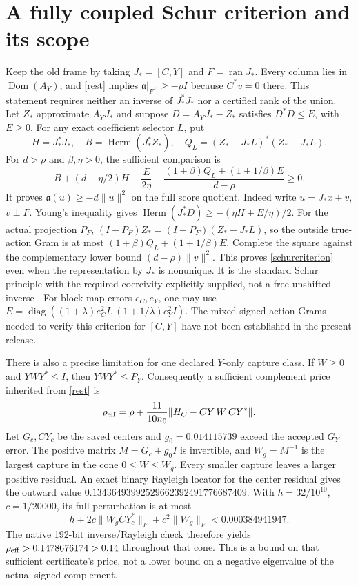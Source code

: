 \documentclass[11pt]{article}
\newcommand{\Ran}{\operatorname{ran}}
\newcommand{\Dom}{\operatorname{Dom}}
\numberwithin{equation}{section}
\begin{document}
\section{A fully coupled Schur criterion and its scope}\label{schur}
Keep the old frame by taking $J_*= [C,Y]$ and $F=\Ran J_*$.
Every column lies in $\Dom(A_Y)$, and \eqref{rest} implies
$\mathfrak a|_{F^\perp}\ge-\rho I$ because $C^*v=0$ there.
This statement requires neither an inverse of $J_*^*J_*$ nor a
certified rank of the union.
Let $Z_*$ approximate $A_YJ_*$ and suppose
$D=A_YJ_*-Z_*$ satisfies $D^*D\le E$, with $E\ge0$.
For any exact coefficient selector $L$, put
\[
 H=J_*^*J_*,\quad B=\operatorname{Herm}(J_*^*Z_*),\quad
 Q_L=(Z_*-J_*L)^*(Z_*-J_*L).
\]
For $d>\rho$ and $\beta,\eta>0$, the sufficient comparison is
\begin{equation}\label{schurcriterion}
 B+(d-\eta/2)H-\frac E{2\eta}
 -\frac{(1+\beta)Q_L+(1+1/\beta)E}{d-\rho}\ge0.
\end{equation}
It proves $\mathfrak a(u)\ge-d\|u\|^2$ on the full score quotient.
Indeed write $u=J_*x+v$, $v\perp F$. Young's inequality gives
$\operatorname{Herm}(J_*^*D)\ge-(\eta H+E/\eta)/2$.
For the actual projection $P_F$,
$(I-P_F)Z_*=(I-P_F)(Z_*-J_*L)$, so the outside true-action Gram is
at most $(1+\beta)Q_L+(1+1/\beta)E$. Complete the square against
the complementary lower bound $(d-\rho)\|v\|^2$.
This proves \eqref{schurcriterion} even when the representation by
$J_*$ is nonunique. It is the standard Schur principle with the
required coercivity explicitly supplied, not a free unshifted inverse
\cite[Theorem 1.2]{DSS}.
For block map errors $e_C,e_Y$, one may use
$E=\operatorname{diag}((1+\lambda)e_C^2I,(1+1/\lambda)e_Y^2I)$.
The mixed signed-action Grams needed to verify this criterion for
$[C,Y]$ have not been established in the present release.

There is also a precise limitation for one declared $Y$-only capture
class. If $W\ge0$ and $YWY^*\le I$, then $YWY^*\le P_Y$.
Consequently a sufficient complement price inherited from
\eqref{rest} is
\[
 \rho_{\rm eff}=\rho+\frac{11}{10n_0}
      \|H_C-CY\,W\,CY^*\|.
\]
Let $G_c,CY_c$ be the saved centers and
$g_0=0.014115739$ exceed the accepted $G_Y$ error. The positive
matrix $M=G_c+g_0I$ is invertible, and $W_g=M^{-1}$ is the largest
capture in the cone $0\le W\le W_g$. Every smaller capture leaves
a larger positive residual. An exact binary Rayleigh locator for
the center residual gives the outward value
$0.13436493992529662392491776687409$.
With $h=32/10^{10}$, $c=1/20000$, its full perturbation is at most
\[
 h+2c\|W_gCY_c^*\|_F+c^2\|W_g\|_F<0.000384941947.
\]
The native 192-bit inverse/Rayleigh check therefore yields
$\rho_{\rm eff}>0.1478676174>0.14$ throughout that cone.
This is a bound on that sufficient certificate's price, not a lower
bound on a negative eigenvalue of the actual signed complement.
\end{document}
